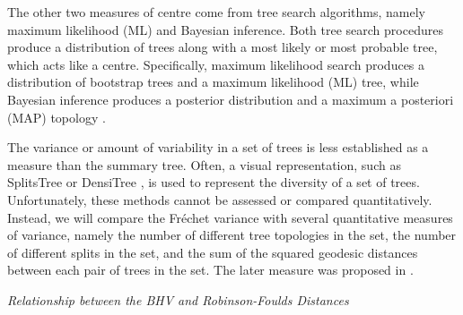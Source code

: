 \documentclass[12pt,letterpaper]{article}
\theoremstyle{plain}
\theoremstyle{definition}
\renewcommand{\subsection}[1]{%
\bigskip
\begin{center}
\begin{large}
\normalfont\itshape #1
\end{large}
\end{center}}
\begin{document}
The other two measures of centre come from tree search algorithms, namely maximum likelihood (ML) and Bayesian inference.  Both tree search procedures produce a distribution of trees along with a most likely or most probable tree, which acts like a centre.  Specifically, maximum likelihood search produces a distribution of bootstrap trees \citep{bootstrap} and a maximum likelihood (ML) tree, while Bayesian inference produces a posterior distribution and a maximum a posteriori (MAP) topology \cite{rannala1996probability}.

The variance or amount of variability in a set of trees is less established as a measure than the summary tree.  Often, a visual representation, such as SplitsTree \citep{splitstree4} or DensiTree \citep{densitree}, is used to represent the diversity of a set of trees.  Unfortunately, these methods cannot be assessed or compared quantitatively.  Instead, we will compare the Fr\'echet variance with several quantitative measures of variance, namely the number of different tree topologies in the set, the number of different splits in the set, and the sum of the squared geodesic distances between each pair of trees in the set.  The later measure was proposed in \citet{CH}. %


\subsection{Relationship between the BHV and Robinson-Foulds Distances}
\end{document}
